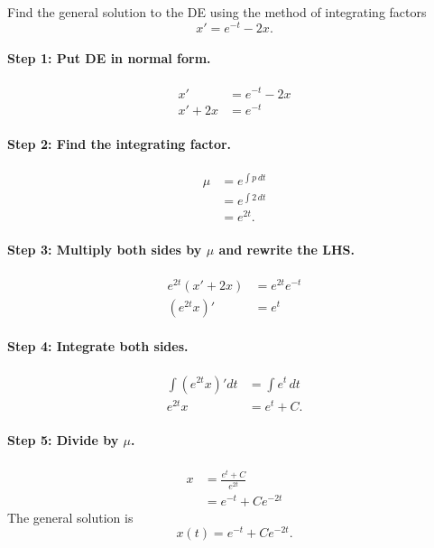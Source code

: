 \documentclass[10pt,letterpaper]{article}
\begin{document}
\begin{example}[1]{    
Find the general solution to the DE using the method of integrating factors 
\[
x' = e^{-t}-2x.
\]
}
\paragraph{Step 1: Put DE in normal form.}
\begin{align*}
x' &= e^{-t}-2x\\
x' + 2x &= e^{-t}
\end{align*}

\paragraph{Step 2: Find the integrating factor.}

\begin{align*}
\mu &= e^{\int p \,dt}\\
    &= e^{\int 2\,dt}\\
    &= e^{2t}.
\end{align*}

\paragraph{Step 3: Multiply both sides by $\mu$ and rewrite the LHS.}
\begin{align*}    
e^{2t}(x' + 2x )&= e^{2t}e^{-t}\\
(e^{2t}x)' &= e^{t}
\end{align*}

\paragraph{Step 4: Integrate both sides.}
\begin{align*}    
\int (e^{2t}x)'dt &= \int e^{t}\,dt\\
e^{2t}x &=e^{t} + C.
\end{align*}

\paragraph{Step 5: Divide by $\mu$.}
\begin{align*}
    x &= \frac{e^t +C}{e^{2t}}\\
      &= e^{-t} + Ce^{-2t}
\end{align*}
The general solution is
\[
\boxed{
x(t) = e^{-t} + C e^{-2t}.
}
\]
\end{example}
\end{document}
